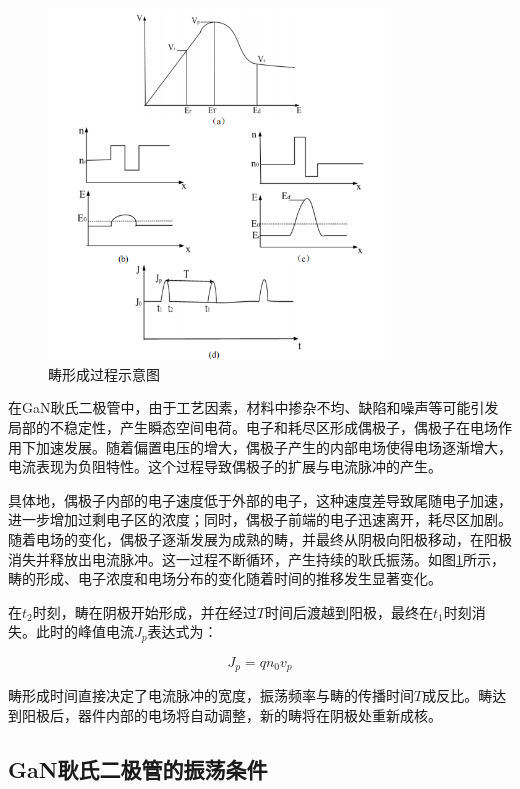 \documentclass[12pt,hyperref,a4paper,UTF8]{ctexart}
\begin{document}
\begin{figure}[H]
\centering
\includegraphics[width=0.8\textwidth]{figures/fig/image5.png}
\caption{畴形成过程示意图\cite{1019000519.nh}} 
\label{fig:image5}
\end{figure}

在GaN耿氏二极管中，由于工艺因素，材料中掺杂不均、缺陷和噪声等可能引发局部的不稳定性，产生瞬态空间电荷。电子和耗尽区形成偶极子，偶极子在电场作用下加速发展。随着偏置电压的增大，偶极子产生的内部电场使得电场逐渐增大，电流表现为负阻特性。这个过程导致偶极子的扩展与电流脉冲的产生。

具体地，偶极子内部的电子速度低于外部的电子，这种速度差导致尾随电子加速，进一步增加过剩电子区的浓度；同时，偶极子前端的电子迅速离开，耗尽区加剧。随着电场的变化，偶极子逐渐发展为成熟的畴，并最终从阴极向阳极移动，在阳极消失并释放出电流脉冲。这一过程不断循环，产生持续的耿氏振荡。如图\ref{fig:image5}所示，畴的形成、电子浓度和电场分布的变化随着时间的推移发生显著变化。

在$t_2$时刻，畴在阴极开始形成，并在经过$T$时间后渡越到阳极，最终在$t_1$时刻消失。此时的峰值电流$J_p$表达式为：

\begin{equation}
J_p = q n_0 v_p 
\end{equation}

畴形成时间直接决定了电流脉冲的宽度，振荡频率与畴的传播时间$T$成反比。畴达到阳极后，器件内部的电场将自动调整，新的畴将在阴极处重新成核。

\subsection{GaN耿氏二极管的振荡条件}
\end{document}
